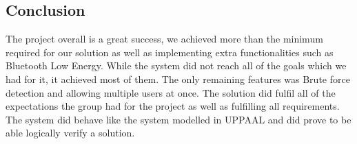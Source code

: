 \subsection{Conclusion}
The project overall is a great success, we achieved more than the minimum required for our solution as well as implementing extra functionalities such as Bluetooth Low Energy. While the system did not reach all of the goals which we had for it, it achieved most of them. The only remaining features was Brute force detection and allowing multiple users at once. The solution did fulfil all of the expectations the group had for the project as well as fulfilling all requirements. The system did behave like the system modelled in UPPAAL and did prove to be able logically verify a solution.
